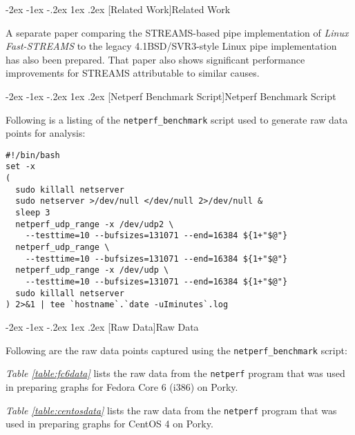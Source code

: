 \documentclass[letterpaper,final,notitlepage,twocolumn,10pt,twoside]{article}
\makeatletter
\renewcommand\section{\@startsection {section}{1}{\z@}%
                                   {-2ex \@plus -1ex \@minus -.2ex}%
                                   {1ex \@plus .2ex}%
                                   {\normalfont\large\bfseries}}
\makeatother
\begin{document}
\section[Related Work]{Related Work}

A separate paper comparing the STREAMS-based pipe implementation of
\textsl{Linux Fast-STREAMS} to the legacy 4.1BSD/SVR3-style Linux pipe
implementation has also been prepared.  That paper also shows significant
performance improvements for STREAMS attributable to similar causes.

\FloatBarrier
{}


\clearpage
\begin{appendix}

\section[Netperf Benchmark Script]{Netperf Benchmark Script}
\label{section:script}

Following is a listing of the \texttt{netperf\_benchmark} script used to
generate raw data points for analysis:

\small
\begin{verbatim}
#!/bin/bash
set -x
(
  sudo killall netserver
  sudo netserver >/dev/null </dev/null 2>/dev/null &
  sleep 3
  netperf_udp_range -x /dev/udp2 \
    --testtime=10 --bufsizes=131071 --end=16384 ${1+"$@"}
  netperf_udp_range \
    --testtime=10 --bufsizes=131071 --end=16384 ${1+"$@"}
  netperf_udp_range -x /dev/udp \
    --testtime=10 --bufsizes=131071 --end=16384 ${1+"$@"}
  sudo killall netserver
) 2>&1 | tee `hostname`.`date -uIminutes`.log
\end{verbatim}

\section[Raw Data]{Raw Data}
\label{section:rawdata}

Following are the raw data points captured using the
\texttt{netperf\_benchmark} script:

\textit{Table \ref{table:fc6data}} lists the raw data from the
\texttt{netperf} program that was used in preparing graphs for Fedora Core 6
(i386) on Porky.

\textit{Table \ref{table:centosdata}} lists the raw data from the
\texttt{netperf} program that was used in preparing graphs for CentOS 4 on
Porky.


\end{appendix}
\end{document}
